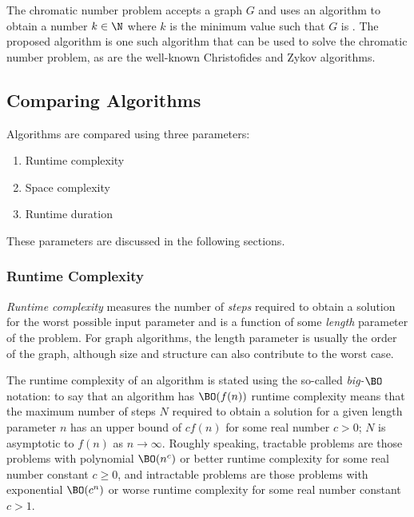 The chromatic number problem accepts a graph \(G\) and uses an algorithm to obtain a number \(k\in\N\) where \(k\)
is the minimum value such that \(G\) is .  The proposed algorithm is one such algorithm that can be
used to solve the chromatic number problem, as are the well-known Christofides and Zykov algorithms.

\subsection{Comparing Algorithms}\label{sec:sub:compare}

Algorithms are compared using three parameters:
\begin{enumerate}
\item Runtime complexity
\item Space complexity
\item Runtime duration
\end{enumerate}

These parameters are discussed in the following sections.

\subsubsection{Runtime Complexity}\label{sec:sub:sub:runtime}

\emph{Runtime complexity} measures the number of \emph{steps} required to obtain a solution for the worst possible
input parameter and is a function of some \emph{length} parameter of the problem.  For graph algorithms, the length
parameter is usually the order of the graph, although size and structure can also contribute to the worst case.

The runtime complexity of an algorithm is stated using the so-called \emph{big-\(\BO\)} notation: to say that an
algorithm has \(\BO(f(n))\) runtime complexity means that the maximum number of steps \(N\) required to obtain a
solution for a given length parameter \(n\) has an upper bound of \(cf(n)\) for some real number \(c>0\); \(N\) is
asymptotic to \(f(n)\) as \(n\to\infty\).  Roughly speaking, tractable problems are those problems with polynomial
\(\BO(n^c)\) or better runtime complexity for some real number constant \(c\ge0\), and intractable problems are
those problems with exponential \(\BO(c^n)\) or worse runtime complexity for some real number constant \(c>1\).

